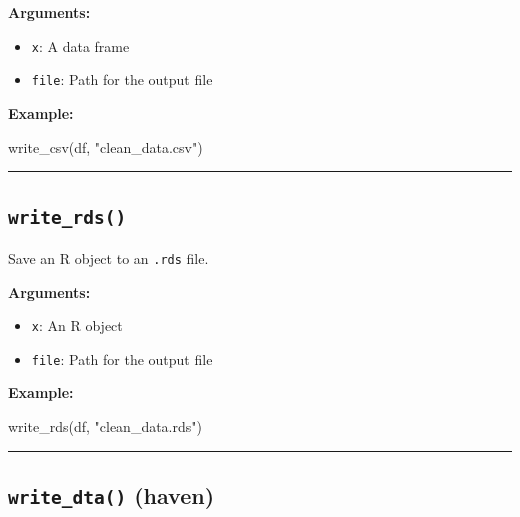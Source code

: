 \documentclass[
  letterpaper,
  DIV=11,
  numbers=noendperiod]{scrreprt}
\newenvironment{Shaded}{\begin{snugshade}}{\end{snugshade}}
\newcommand{\FunctionTok}[1]{\textcolor[rgb]{0.28,0.35,0.67}{#1}}
\newcommand{\NormalTok}[1]{\textcolor[rgb]{0.00,0.23,0.31}{#1}}
\newcommand{\StringTok}[1]{\textcolor[rgb]{0.13,0.47,0.30}{#1}}
\providecommand{\tightlist}{%
  \setlength{\itemsep}{0pt}\setlength{\parskip}{0pt}}
\begin{document}
\textbf{Arguments:}

\begin{itemize}
\tightlist
\item
  \texttt{x}: A data frame
\item
  \texttt{file}: Path for the output file
\end{itemize}

\textbf{Example:}

\begin{Shaded}
\begin{Highlighting}[]
\FunctionTok{write\_csv}\NormalTok{(df, }\StringTok{"clean\_data.csv"}\NormalTok{)}
\end{Highlighting}
\end{Shaded}

\begin{center}\rule{0.5\linewidth}{0.5pt}\end{center}

\subsection{\texorpdfstring{\texttt{write\_rds()}}{write\_rds()}}\label{write_rds}

Save an R object to an \texttt{.rds} file.

\textbf{Arguments:}

\begin{itemize}
\tightlist
\item
  \texttt{x}: An R object
\item
  \texttt{file}: Path for the output file
\end{itemize}

\textbf{Example:}

\begin{Shaded}
\begin{Highlighting}[]
\FunctionTok{write\_rds}\NormalTok{(df, }\StringTok{"clean\_data.rds"}\NormalTok{)}
\end{Highlighting}
\end{Shaded}

\begin{center}\rule{0.5\linewidth}{0.5pt}\end{center}

\subsection{\texorpdfstring{\texttt{write\_dta()}
(haven)}{write\_dta() (haven)}}\label{write_dta-haven}
\end{document}
